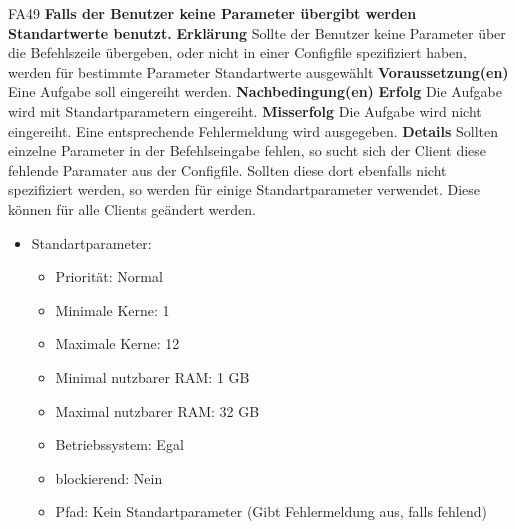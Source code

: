 \documentclass[a4paper,12pt]{article}
\begin{document}
\begin{itemize}[nosep]
	\begin{minipage}[t]{\linewidth}
		\item[FA49] \textbf{Falls der \gls{Benutzer} keine Parameter übergibt werden Standartwerte benutzt.}
		\subitem \textbf{Erklärung} Sollte der \gls{Benutzer} keine Parameter über die Befehlszeile übergeben, oder nicht in einer Configfile spezifiziert haben, werden für bestimmte Parameter Standartwerte ausgewählt
		\subitem \textbf{Voraussetzung(en)} Eine Aufgabe soll eingereiht werden.
		\subitem \textbf{Nachbedingung(en)}
		\subsubitem \textbf{Erfolg} Die Aufgabe wird mit Standartparametern eingereiht.
		\subsubitem \textbf{Misserfolg} Die Aufgabe wird nicht eingereiht. Eine entsprechende Fehlermeldung wird ausgegeben.
		\subitem \textbf{Details} Sollten einzelne Parameter in der Befehlseingabe fehlen, so sucht sich der \gls{Client} diese fehlende Paramater aus der Configfile. Sollten diese dort ebenfalls nicht spezifiziert werden, so werden für einige Standartparameter verwendet.
		Diese können für alle \glspl{Client} geändert werden.
		\begin{itemize}[nosep,label={}]
			\item Standartparameter:
	    \begin{itemize}[nosep]
			\item Priorität: Normal
			\item Minimale Kerne: 1
			\item Maximale Kerne: 12
			\item Minimal nutzbarer RAM: 1 GB
			\item Maximal nutzbarer RAM: 32 GB
			\item Betriebssystem: Egal
			\item blockierend: Nein
			\item Pfad: Kein Standartparameter (Gibt Fehlermeldung aus, falls fehlend)
		\end{itemize}
	\end{itemize}
	\end{minipage}
	\newline
	\\
	

\end{itemize}
\end{document}
